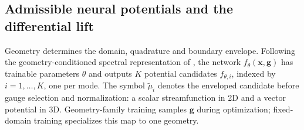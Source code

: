 \subsection{Admissible neural potentials and the differential lift}
\begingroup
Geometry determines the domain, quadrature and boundary envelope. Following the geometry-conditioned spectral representation of \citet{chang2025shapespacespectra}, the network $f_\theta(\mathbf x,\mathbf g)$ has trainable parameters $\theta$ and outputs $K$ potential candidates $f_{\theta,i}$, indexed by $i=1,\ldots,K$, one per mode. The symbol $\widetilde\mu_i$ denotes the enveloped candidate before gauge selection and normalization: a scalar streamfunction in 2D and a vector potential in 3D. Geometry-family training samples $\mathbf g$ during optimization; fixed-domain training specializes this map to one geometry.
\par\endgroup

